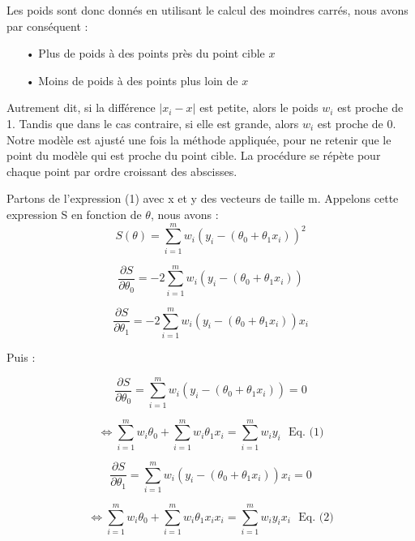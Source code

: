 \documentclass[a4paper,12pt]{article} %
\begin{document}
                    Les poids sont donc donnés en utilisant le calcul des moindres carrés, nous avons par conséquent :
                    \begin{itemize}
                        \item[•] Plus de poids à des points près du point cible $x$ 
                        \item[•] Moins de poids à des points plus loin de $x$
                    \end{itemize}
                    Autrement dit, si la différence $| x_i - x |$ est petite, alors le poids $w_i$ est proche de 1. Tandis que dans le cas contraire, si elle est grande, alors $w_i$ est proche de 0. 
                    Notre modèle est ajusté une fois la méthode appliquée, pour ne retenir que le point du modèle qui est proche du point cible. La procédure se répète pour chaque point par ordre croissant des abscisses.
                    
                    Partons de l'expression (1) avec  x et y  des vecteurs de taille m. Appelons cette expression S en fonction de $\theta$, nous avons :
                    \[S(\theta) = \sum_{i=1}^m w_i \left( y_i - (\theta_0 + \theta_1 x_i) \right)^2\]
                    
                    \[\frac{\partial S}{\partial \theta_0} = -2 \sum_{i=1}^m w_i \left( y_i - (\theta_0 + \theta_1 x_i) \right) \]
                    
                    \[ \frac{\partial S}{\partial \theta_1} = -2 \sum_{i=1}^m w_i \left( y_i - (\theta_0 + \theta_1 x_i) \right) x_i \]
                    
                    
                    Puis :
                    
                    \[\frac{\partial S}{\partial \theta_0} = \sum_{i=1}^m w_i \left( y_i - (\theta_0 + \theta_1 x_i) \right)  = 0\]
                    
                    \[ \iff \sum_{i=1}^m w_i  \theta_0 + \sum_{i=1}^m w_i  \theta_1 x_i  = \sum_{i=1}^m w_i y_i  \ \ \ \text{Eq. (1)}\]
                    
                    \[\frac{\partial S}{\partial \theta_1} = \sum_{i=1}^m w_i \left( y_i - (\theta_0 + \theta_1 x_i) \right) x_i  = 0\] 
                    
                    \[\iff \sum_{i=1}^m w_i  \theta_0 + \sum_{i=1}^m w_i  \theta_1 x_i x_i  = \sum_{i=1}^m w_i y_i  x_i \ \ \ \text{Eq. (2)}\]
                    
\end{document}
